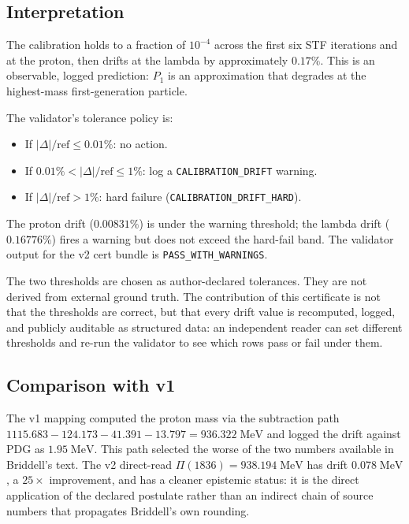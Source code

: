 \documentclass[12pt,a4paper]{article}
\begin{document}
\subsection{Interpretation}

The calibration holds to a fraction of $10^{-4}$ across the first six
STF iterations and at the proton, then drifts at the lambda by
approximately $0.17\%$. This is an observable, logged prediction:
$P_1$ is an approximation that degrades at the highest-mass
first-generation particle.

The validator's tolerance policy is:
\begin{itemize}[nosep]
  \item If $|\Delta|/\text{ref} \leq 0.01\%$: no action.
  \item If $0.01\% < |\Delta|/\text{ref} \leq 1\%$: log a
        \texttt{CALIBRATION\_DRIFT} warning.
  \item If $|\Delta|/\text{ref} > 1\%$: hard failure
        (\texttt{CALIBRATION\_DRIFT\_HARD}).
\end{itemize}
The proton drift ($0.00831\%$) is under the warning threshold; the
lambda drift ($0.16776\%$) fires a warning but does not exceed the
hard-fail band. The validator output for the v2 cert bundle is
\texttt{PASS\_WITH\_WARNINGS}.

The two thresholds are chosen as author-declared tolerances. They
are not derived from external ground truth. The contribution of this
certificate is not that the thresholds are correct, but that every
drift value is recomputed, logged, and publicly auditable as
structured data: an independent reader can set different thresholds
and re-run the validator to see which rows pass or fail under them.

\subsection{Comparison with v1}

The v1 mapping computed the proton mass via the subtraction path
$1115.683 - 124.173 - 41.391 - 13.797 = 936.322\;\mathrm{MeV}$ and
logged the drift against PDG as $1.95\;\mathrm{MeV}$. This path
selected the worse of the two numbers available in Briddell's text.
The v2 direct-read $\Pi(1836) = 938.194\;\mathrm{MeV}$ has drift
$0.078\;\mathrm{MeV}$, a $25\times$ improvement, and has a cleaner
epistemic status: it is the direct application of the declared
postulate rather than an indirect chain of source numbers that
propagates Briddell's own rounding.
\end{document}
